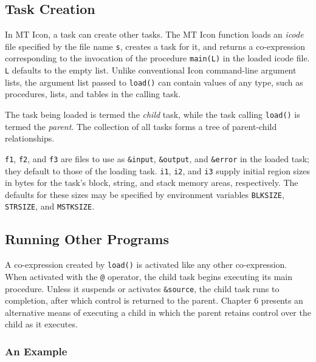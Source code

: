 \subsection{Task Creation}

In MT Icon, a task can create other tasks.  The MT Icon function
\noindent loads an {\em icode\/} file \cite{Griswold86} specified by
the file name {\tt s}, creates a task for it, and returns a
co-expression corresponding to the invocation of the procedure
{\tt main(L)} in the loaded icode file. {\tt L} defaults to the empty list.
Unlike conventional Icon command-line argument lists, the argument list
passed to {\tt load()} can contain values of any type, such as procedures,
lists, and tables in the calling task.

The task being loaded is termed the {\em child\/} task, while
the task calling {\tt load()} is termed the {\em parent\/}.  The
collection of all tasks forms a tree of parent-child relationships.

{\tt f1}, {\tt f2}, and {\tt f3} are files to use as
{\tt \&input}, {\tt \&output}, and {\tt \&error} in the loaded
task; they default to those of the loading task.  {\tt i1}, {\tt i2},
and {\tt i3} supply initial region sizes in bytes for the
task's block, string, and stack memory areas, respectively. 
The defaults for these sizes may be specified by environment variables
{\tt BLKSIZE}, {\tt STRSIZE}, and {\tt MSTKSIZE}.

\subsection{Running Other Programs}

A co-expression created by {\tt load()} is activated like any other
co-expression. When activated with the {\tt @} operator, the child
task begins executing its main procedure. Unless it suspends or
activates {\tt \&source},
the child task runs to completion, after which control is returned
to the parent.  Chapter 6 presents an alternative means of executing
a child in which the parent retains control over the child as it executes.

\subsubsection*{An Example}

